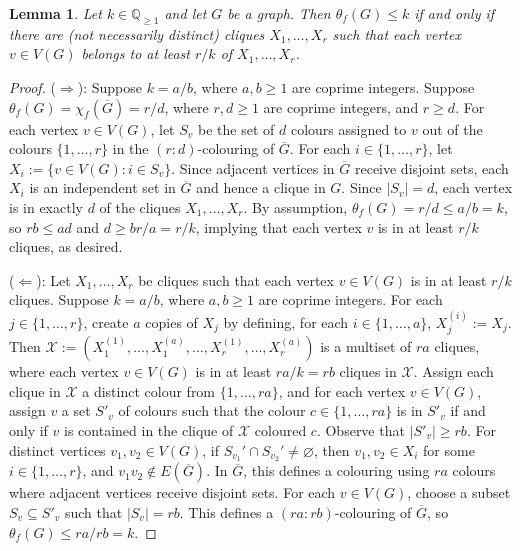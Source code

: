 \documentclass[11pt]{article}
\numberwithin{equation}{section}
\theoremstyle{plain}
\newtheorem{lem}[equation]{Lemma}
\theoremstyle{definition}
\renewcommand{\geq}{\geqslant}
\renewcommand{\leq}{\leqslant}
\newcommand{\Q}{\mathbb{Q}}
\begin{document}
\begin{lem}
    \label{lem:equiv_frac}
    Let $k \in \Q_{\geq 1}$ and let $G$ be a graph. Then $\theta_f(G) \leq k$ if and only if there are (not necessarily distinct) cliques $X_1, \dots, X_r$ such that each vertex $v \in V(G)$ belongs to at least $r/k$ of $X_1, \dots, X_r$.
\end{lem}
\begin{proof}
    ($\Rightarrow$): Suppose $k = a/b$, where $a, b \geq 1$ are coprime integers. Suppose $\theta_f(G) = \chi_f(\overline{G}) = r/d$, where $r,d \geq 1$ are coprime integers, and $r \geq d$. For each vertex $v \in V(G)$, let $S_v$ be the set of $d$ colours assigned to $v$ out of the colours $\{1, \dots, r\}$ in the $(r:d)$-colouring of $\overline{G}$. For each $i \in \{1, \dots, r\}$, let $X_i:= \{v \in V(G) : i \in S_v\}$. Since adjacent vertices in $\overline{G}$ receive disjoint sets, each $X_i$ is an independent set in $\overline{G}$ and hence a clique in $G$. Since $|S_v| = d$, each vertex is in exactly $d$ of the cliques $X_1, \dots, X_r$. By assumption, $\theta_f(G) = r/d \leq a/b = k$, so $rb \leq ad$ and $d \geq br/a = r/k$, implying that each vertex $v$ is in at least $r/k$ cliques, as desired.

    ($\Leftarrow$): Let $X_1, \dots, X_r$ be cliques such that each vertex $v \in V(G)$ is in at least $r/k$ cliques. Suppose $k = a/b$, where $a, b \geq 1$ are coprime integers. For each $j \in \{1, \dots, r\}$, create $a$ copies of $X_j$ by defining, for each $i \in \{1, \dots, a\}$, $X_j^{(i)}:= X_j$. Then
    $\mathcal{X}:= (X_1^{(1)}, \dots, X_1^{(a)}, \dots, X_r^{(1)}, \dots, X_r^{(a)})$
    is a multiset of $ra$ cliques, where each vertex $v \in V(G)$ is in at least $ra/k = rb$ cliques in $\mathcal{X}$. Assign each clique in $\mathcal{X}$ a distinct colour from $\{1, \dots, ra\}$, and for each vertex $v \in V(G)$, assign $v$ a set $S'_v$ of colours such that the colour $c \in \{1, \dots, ra\}$ is in $S'_v$ if and only if $v$ is contained in the clique of $\mathcal{X}$ coloured $c$. Observe that $|S'_v| \geq rb$. For distinct vertices $v_1, v_2 \in V(G)$, if $S_{v_1}' \cap S_{v_2}' \neq \varnothing$, then $v_1,v_2 \in X_i$ for some $i \in \{1, \dots, r\}$, and $v_1v_2 \notin E(\overline{G})$. In $\overline{G}$, this defines a colouring using $ra$ colours where adjacent vertices receive disjoint sets. For each $v \in V(G)$, choose a subset $S_v \subseteq S'_v$ such that $|S_v| = rb$. This defines a $(ra: rb)$-colouring of $\overline{G}$, so $\theta_f(G) \leq ra/rb = k$.
\end{proof}
\end{document}
